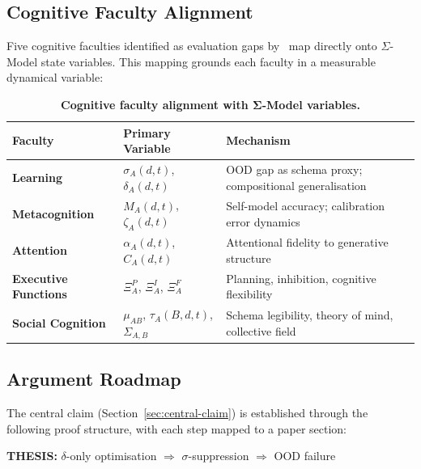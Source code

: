 \subsection{Cognitive Faculty Alignment}\label{sec:cognitive-faculty-alignment}

Five cognitive faculties identified as evaluation gaps
by~\cite{burnell2026measuringprogressagi} map directly onto
$\Sigma$-Model state variables. This mapping grounds each faculty in a
measurable dynamical variable:

\begin{table}[htbp]
\centering
\caption{\textbf{Cognitive faculty alignment with Σ-Model variables.}}
\label{tab:faculty-alignment}
\begin{tabular}{>{\raggedright}p{2.8cm} >{\raggedright}p{3.2cm} >{\raggedright\arraybackslash}p{7.2cm}}
\toprule
\textbf{Faculty} & \textbf{Primary Variable} & \textbf{Mechanism} \\
\midrule
\textbf{Learning} & $\sigma_A(d,t)$, $\delta_A(d,t)$ & OOD gap as schema proxy; compositional generalisation \\
\textbf{Metacognition} & $\hat{M}_A(d,t)$, $\zeta_A(d,t)$ & Self-model accuracy; calibration error dynamics \\
\textbf{Attention} & $\alpha_A(d,t)$, $C_A(d,t)$ & Attentional fidelity to generative structure \\
\textbf{Executive Functions} & $\Xi_A^P$, $\Xi_A^I$, $\Xi_A^F$ & Planning, inhibition, cognitive flexibility \\
\textbf{Social Cognition} & $\mu_{AB}$, $\tau_A(B,d,t)$, $\Sigma_{A,B}$ & Schema legibility, theory of mind, collective field \\
\bottomrule
\end{tabular}
\end{table}

\subsection{Argument Roadmap}\label{sec:argument-roadmap}

The central claim (Section~\ref{sec:central-claim}) is established through the
following proof structure, with each step mapped to a paper section:

\textbf{THESIS:} $\delta$-only optimisation $\Rightarrow$ $\sigma$-suppression $\Rightarrow$ OOD failure

